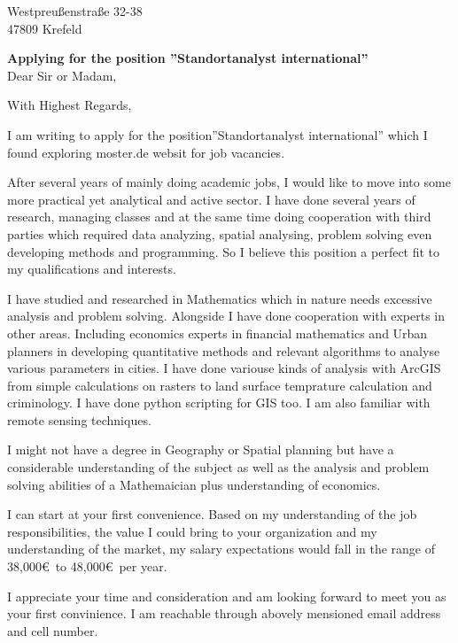\documentclass[11pt,a4paper,sans]{moderncv}        %
\title{}                               %
\begin{document}
{Westpreußenstraße 32-38 \\
47809 Krefeld}
\date{November 13, 2015}
\opening{\textbf{Applying for the position ''Standortanalyst international''}\\Dear Sir or Madam,}
\closing{With Highest Regards,}
\makelettertitle
I am writing to apply for the position''Standortanalyst international'' which I found exploring moster.de websit for job vacancies.

After several years of mainly doing academic jobs, I would like to move into some more practical yet analytical and active sector. I have done several years of research, managing classes and at the same time doing  cooperation with third parties which required data analyzing, spatial analysing, problem solving even developing methods and programming. So I believe this position a perfect fit to my qualifications and interests.

I have studied and researched in Mathematics which in nature needs excessive analysis and problem solving. Alongside I have done cooperation with experts in other areas. Including economics experts in financial mathematics and Urban planners in developing quantitative methods and  relevant algorithms to analyse various parameters in cities. I have done variouse kinds of analysis with ArcGIS from simple calculations on rasters to land surface temprature calculation and criminology. I have done python scripting for GIS too. I am also familiar with remote sensing techniques.

I might not have a degree in Geography or Spatial planning but have a considerable understanding of the subject as well as the analysis and problem solving abilities of a Mathemaician plus understanding of economics. 

I can start at your first convenience. Based on my understanding of the job responsibilities, the value I could bring to your organization and my understanding of the market, my salary expectations would fall in the range of 38,000\euro \ to 48,000\euro \ per year.

 I appreciate your time and consideration and am looking forward to meet you as your first convinience. I am reachable through abovely mensioned email address and cell number.
 \vspace{3mm}
 
\makeletterclosing
\end{document}
